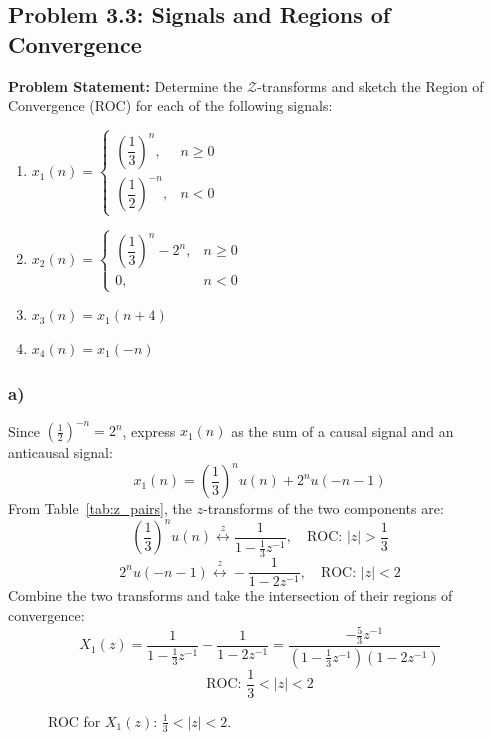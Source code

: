 \documentclass[12pt,a4paper]{article}
\begin{document}
\subsection{Problem 3.3: Signals and Regions of Convergence}
\textbf{Problem Statement:} Determine the $\mathcal{Z}$-transforms and sketch the Region of Convergence (ROC) for each of the following signals:
\begin{enumerate}[label=(\alph*)]
    \item $x_1(n) = \begin{cases} \left(\dfrac{1}{3}\right)^n, & n \ge 0 \\ \left(\dfrac{1}{2}\right)^{-n}, & n < 0 \end{cases}$
    \item $x_2(n) = \begin{cases} \left(\dfrac{1}{3}\right)^n - 2^n, & n \ge 0 \\ 0, & n < 0 \end{cases}$
    \item $x_3(n) = x_1(n+4)$
    \item $x_4(n) = x_1(-n)$
\end{enumerate}

\subsubsection*{a)}
Since $\left(\frac{1}{2}\right)^{-n} = 2^n$, express $x_1(n)$ as the sum of a causal signal and an anticausal signal:
\[
x_1(n) = \left(\frac{1}{3}\right)^n u(n) + 2^n u(-n - 1)
\]
From Table~\ref{tab:z_pairs}, the $z$-transforms of the two components are:
\[
\left(\frac{1}{3}\right)^n u(n) \stackrel{z}{\longleftrightarrow} \frac{1}{1 - \frac{1}{3}z^{-1}}, \quad \text{ROC: } |z| > \frac{1}{3}
\]
\[
2^n u(-n - 1) \stackrel{z}{\longleftrightarrow} -\frac{1}{1 - 2z^{-1}}, \quad \text{ROC: } |z| < 2
\]
Combine the two transforms and take the intersection of their regions of convergence:
\[
X_1(z) = \frac{1}{1 - \frac{1}{3}z^{-1}} - \frac{1}{1 - 2z^{-1}} = \frac{-\frac{5}{3}z^{-1}}{\left(1 - \frac{1}{3}z^{-1}\right)(1 - 2z^{-1})}
\]
\[
\text{ROC: } \frac{1}{3} < |z| < 2
\]

\begin{figure}[H]
\centering
{}
\caption{ROC for $X_1(z)$: $\frac{1}{3} < |z| < 2$.}
\label{fig:p33_roc_a}
\end{figure}
\end{document}
